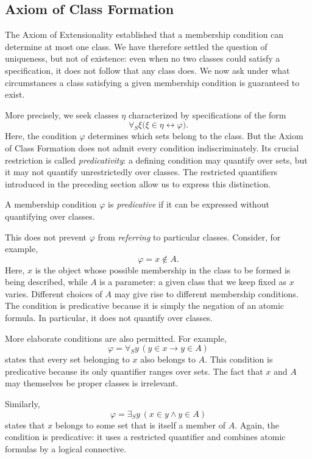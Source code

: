 \subsection{Axiom of Class Formation}

The Axiom of Extensionality established that a membership condition can determine at most one class. We have therefore settled the question of uniqueness, but not of existence: even when no two classes could satisfy a specification, it does not follow that any class does. We now ask under what circumstances a class satisfying a given membership condition is guaranteed to exist.

More precisely, we seek classes \(\eta\) characterized by specifications of the form
\[
\forall_S\xi\bigl(\xi\in\eta\leftrightarrow\varphi\bigr).
\]
Here, the condition \(\varphi\) determines which sets belong to the class. But the Axiom of Class Formation does not admit every condition indiscriminately. Its crucial restriction is called \emph{predicativity}: a defining condition may quantify over sets, but it may not quantify unrestrictedly over classes. The restricted quantifiers introduced in the preceding section allow us to express this distinction.

\begin{definition}
A membership condition \(\varphi\) is \textit{predicative} if it can be expressed without quantifying over classes.
\end{definition}

This does not prevent \(\varphi\) from \textit{referring} to particular classes. Consider, for example,
\[
\varphi = x\notin A.
\]
Here, \(x\) is the object whose possible membership in the class to be formed is being described, while \(A\) is a parameter: a given class that we keep fixed as \(x\) varies. Different choices of \(A\) may give rise to different membership conditions. The condition is predicative because it is simply the negation of an atomic formula. In particular, it does not quantify over classes.

More elaborate conditions are also permitted. For example,
\[
\varphi = \forall_S y\,(y\in x\to y\in A)
\]
states that every set belonging to \(x\) also belongs to \(A\). This condition is predicative because its only quantifier ranges over sets. The fact that \(x\) and \(A\) may themselves be proper classes is irrelevant.

Similarly,
\[
\varphi = \exists_S y\,(x\in y\land y\in A)
\]
states that \(x\) belongs to some set that is itself a member of \(A\). Again, the condition is predicative: it uses a restricted quantifier and combines atomic formulas by a logical connective.

